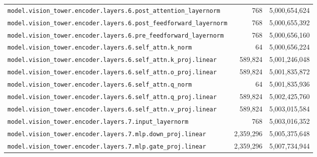 \documentclass[10pt,a4paper]{article}
\theoremstyle{definition}
\begin{document}
\begin{appendices}
\begin{longtable}{p{9.5cm}rr}
\texttt{model.\allowbreak{}vision\_tower.\allowbreak{}encoder.\allowbreak{}layers.\allowbreak{}6.\allowbreak{}post\_attention\_layernorm} & 768 & 5,000,654,624 \\
\texttt{model.\allowbreak{}vision\_tower.\allowbreak{}encoder.\allowbreak{}layers.\allowbreak{}6.\allowbreak{}post\_feedforward\_layernorm} & 768 & 5,000,655,392 \\
\texttt{model.\allowbreak{}vision\_tower.\allowbreak{}encoder.\allowbreak{}layers.\allowbreak{}6.\allowbreak{}pre\_feedforward\_layernorm} & 768 & 5,000,656,160 \\
\texttt{model.\allowbreak{}vision\_tower.\allowbreak{}encoder.\allowbreak{}layers.\allowbreak{}6.\allowbreak{}self\_attn.\allowbreak{}k\_norm} & 64 & 5,000,656,224 \\
\texttt{model.\allowbreak{}vision\_tower.\allowbreak{}encoder.\allowbreak{}layers.\allowbreak{}6.\allowbreak{}self\_attn.\allowbreak{}k\_proj.\allowbreak{}linear} & 589,824 & 5,001,246,048 \\
\texttt{model.\allowbreak{}vision\_tower.\allowbreak{}encoder.\allowbreak{}layers.\allowbreak{}6.\allowbreak{}self\_attn.\allowbreak{}o\_proj.\allowbreak{}linear} & 589,824 & 5,001,835,872 \\
\texttt{model.\allowbreak{}vision\_tower.\allowbreak{}encoder.\allowbreak{}layers.\allowbreak{}6.\allowbreak{}self\_attn.\allowbreak{}q\_norm} & 64 & 5,001,835,936 \\
\texttt{model.\allowbreak{}vision\_tower.\allowbreak{}encoder.\allowbreak{}layers.\allowbreak{}6.\allowbreak{}self\_attn.\allowbreak{}q\_proj.\allowbreak{}linear} & 589,824 & 5,002,425,760 \\
\texttt{model.\allowbreak{}vision\_tower.\allowbreak{}encoder.\allowbreak{}layers.\allowbreak{}6.\allowbreak{}self\_attn.\allowbreak{}v\_proj.\allowbreak{}linear} & 589,824 & 5,003,015,584 \\
\texttt{model.\allowbreak{}vision\_tower.\allowbreak{}encoder.\allowbreak{}layers.\allowbreak{}7.\allowbreak{}input\_layernorm} & 768 & 5,003,016,352 \\
\texttt{model.\allowbreak{}vision\_tower.\allowbreak{}encoder.\allowbreak{}layers.\allowbreak{}7.\allowbreak{}mlp.\allowbreak{}down\_proj.\allowbreak{}linear} & 2,359,296 & 5,005,375,648 \\
\texttt{model.\allowbreak{}vision\_tower.\allowbreak{}encoder.\allowbreak{}layers.\allowbreak{}7.\allowbreak{}mlp.\allowbreak{}gate\_proj.\allowbreak{}linear} & 2,359,296 & 5,007,734,944 \\

\end{longtable}
\end{appendices}
\end{document}
